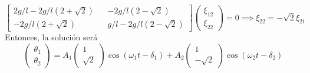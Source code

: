 \[\left[\begin{matrix}
    2g/l-2g/l(2+\sqrt{2}) && -2g/l(2-\sqrt{2}) \\ -2g/l(2+\sqrt{2}) && g/l-2g/l(2-\sqrt{2})
\end{matrix}\right] \left(\begin{matrix}
    \xi_{12} \\ \xi_{22}
\end{matrix}\right) = 0 \implies \xi_{22} = -\sqrt{2}\xi_{21}\]
Entonces, la solución será
\[\left(\begin{matrix}
    \theta_1 \\ \theta_2
\end{matrix}\right) = A_1 \left(\begin{matrix}
    1 \\ \sqrt{2}
\end{matrix}\right) \cos{(\omega_1 t -\delta_1)}+A_2 \left(\begin{matrix}
    1 \\ -\sqrt{2}
\end{matrix}\right) \cos{(\omega_2 t -\delta_2)}\]
